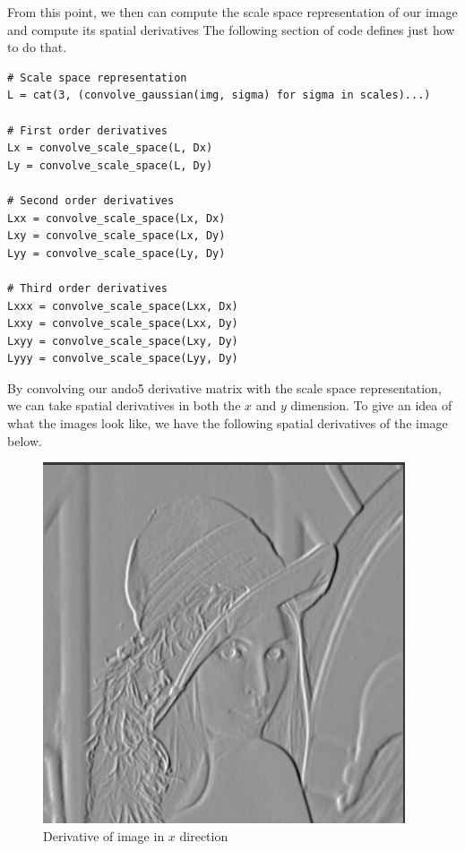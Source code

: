 \documentclass{article}
\begin{document}
From this point, we then can compute the scale space representation of our image and compute its spatial derivatives
The following section of code defines just how to do that.

\begin{lstlisting}
# Scale space representation
L = cat(3, (convolve_gaussian(img, sigma) for sigma in scales)...)

# First order derivatives
Lx = convolve_scale_space(L, Dx)
Ly = convolve_scale_space(L, Dy)

# Second order derivatives
Lxx = convolve_scale_space(Lx, Dx)
Lxy = convolve_scale_space(Lx, Dy)
Lyy = convolve_scale_space(Ly, Dy)

# Third order derivatives
Lxxx = convolve_scale_space(Lxx, Dx)
Lxxy = convolve_scale_space(Lxx, Dy)
Lxyy = convolve_scale_space(Lxy, Dy)
Lyyy = convolve_scale_space(Lyy, Dy)
\end{lstlisting}

By convolving our ando5 derivative matrix with the scale space representation, we can take spatial derivatives in both the $x$ and $y$ dimension. To give an idea of what the images look like, we have the following spatial derivatives of the image below.

\begin{figure}[H]
  \centering
  \includegraphics[scale=0.5]{Images/lx.png}
  \caption{Derivative of image in $x$ direction}
  \label{lx}
\end{figure}
\end{document}
